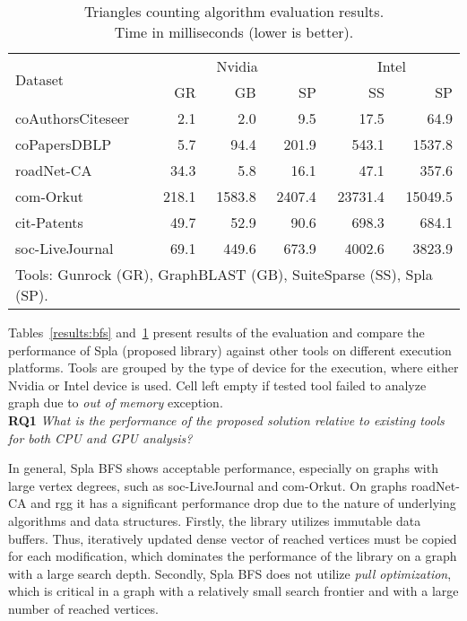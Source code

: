 \begin{table}[h]
\caption{Triangles counting algorithm evaluation results.\\Time in milliseconds (lower is better).} 
\begin{center}
    \begin{tabular}{|l|r|r|r|r|r|}
    \hline
    \multirow{2}{*}{Dataset} & \multicolumn{3}{c|}{Nvidia} & \multicolumn{2}{c|}{Intel} \\
    \cline{2-6}
    & GR & GB & SP & SS & SP \\
    \hline
    \hline
    \rowcolor{black!10} coAuthorsCiteseer &   2.1 &    2.0 &    9.5 &    17.5 &    64.9 \\
    \rowcolor{black!2 } coPapersDBLP      &   5.7 &   94.4 &  201.9 &   543.1 &  1537.8 \\
    \rowcolor{black!10} roadNet-CA        &  34.3 &    5.8 &   16.1 &    47.1 &   357.6 \\
    \rowcolor{black!2 } com-Orkut         & 218.1 & 1583.8 & 2407.4 & 23731.4 & 15049.5 \\
    \rowcolor{black!10} cit-Patents       &  49.7 &   52.9 &   90.6 &   698.3 &   684.1 \\
    \rowcolor{black!2 } soc-LiveJournal   &  69.1 &  449.6 &  673.9 &  4002.6 &  3823.9 \\
    \hline
    \hline
    \multicolumn{6}{l}{Tools: Gunrock (GR), GraphBLAST (GB), SuiteSparse (SS), Spla (SP).} \\
    \end{tabular}
    \label{results:tc}
\end{center}
\end{table}

Tables~\ref{results:bfs} and~\ref{results:tc} present results of the evaluation and compare the performance of Spla (proposed library) against other tools on different execution platforms. Tools are grouped by the type of device for the execution, where either Nvidia or Intel device is used. Cell left empty if tested tool failed to analyze graph due to \textit{out of memory} exception.\\

\textbf{RQ1} \textit{What is the performance of the proposed solution relative to existing tools for both CPU and GPU analysis?}

In general, Spla BFS shows acceptable performance, especially on graphs with large vertex degrees, such as soc-LiveJournal and com-Orkut. On graphs roadNet-CA and rgg it has a significant performance drop due to the nature of underlying algorithms and data structures. Firstly, the library utilizes immutable data buffers. Thus, iteratively updated dense vector of reached vertices must be copied for each modification, which dominates the performance of the library on a graph with a large search depth. Secondly, Spla BFS does not utilize \textit{pull optimization}, which is critical in a graph with a relatively small search frontier and with a large number of reached vertices. 

